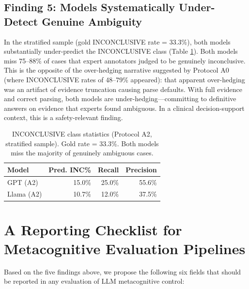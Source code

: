 \documentclass[11pt]{article}
\begin{document}
\subsection{Finding 5: Models Systematically Under-Detect Genuine Ambiguity}
\label{sec:ambiguity}

In the stratified sample (gold INCONCLUSIVE rate = 33.3\%), both models substantially under-predict the INCONCLUSIVE class (Table \ref{tab:inconclusive}). Both models miss 75--88\% of cases that expert annotators judged to be genuinely inconclusive. This is the opposite of the over-hedging narrative suggested by Protocol A0 (where INCONCLUSIVE rates of 48--79\% appeared): that apparent over-hedging was an artifact of evidence truncation causing parse defaults. With full evidence and correct parsing, both models are under-hedging---committing to definitive answers on evidence that experts found ambiguous. In a clinical decision-support context, this is a safety-relevant finding.

\begin{table}[h]
\centering
\small
\begin{tabular}{lrrr}
\toprule
\textbf{Model} & \textbf{Pred. INC\%} & \textbf{Recall} & \textbf{Precision} \\
\midrule
GPT (A2) & 15.0\% & 25.0\% & 55.6\% \\
Llama (A2) & 10.7\% & 12.0\% & 37.5\% \\
\bottomrule
\end{tabular}
\caption{INCONCLUSIVE class statistics (Protocol A2, stratified sample). Gold rate = 33.3\%. Both models miss the majority of genuinely ambiguous cases.}
\label{tab:inconclusive}
\end{table}

\section{A Reporting Checklist for Metacognitive Evaluation Pipelines}
\label{sec:checklist}

Based on the five findings above, we propose the following six fields that should be reported in any evaluation of LLM metacognitive control:
\end{document}
